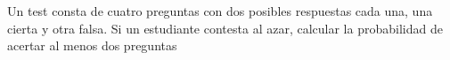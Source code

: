 \documentclass[addpoints,spanish, 12pt,a4paper]{exam}
\begin{document}
\begin{questions}


\question[2] Un test consta de cuatro preguntas con dos posibles respuestas cada una, una cierta y otra falsa. Si un
estudiante contesta al azar, calcular la probabilidad de acertar al menos dos preguntas

\addpoints

\end{questions}
\end{document}
